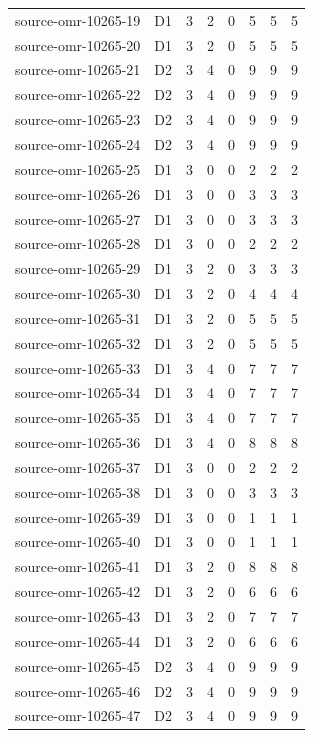 \begin{longtable}{p{}lrrrrrr}
source-omr-10265-19 & D1 & 3 & 2 & 0 & 5 & 5 & 5\\
source-omr-10265-20 & D1 & 3 & 2 & 0 & 5 & 5 & 5\\
source-omr-10265-21 & D2 & 3 & 4 & 0 & 9 & 9 & 9\\
source-omr-10265-22 & D2 & 3 & 4 & 0 & 9 & 9 & 9\\
source-omr-10265-23 & D2 & 3 & 4 & 0 & 9 & 9 & 9\\
source-omr-10265-24 & D2 & 3 & 4 & 0 & 9 & 9 & 9\\
source-omr-10265-25 & D1 & 3 & 0 & 0 & 2 & 2 & 2\\
source-omr-10265-26 & D1 & 3 & 0 & 0 & 3 & 3 & 3\\
source-omr-10265-27 & D1 & 3 & 0 & 0 & 3 & 3 & 3\\
source-omr-10265-28 & D1 & 3 & 0 & 0 & 2 & 2 & 2\\
source-omr-10265-29 & D1 & 3 & 2 & 0 & 3 & 3 & 3\\
source-omr-10265-30 & D1 & 3 & 2 & 0 & 4 & 4 & 4\\
source-omr-10265-31 & D1 & 3 & 2 & 0 & 5 & 5 & 5\\
source-omr-10265-32 & D1 & 3 & 2 & 0 & 5 & 5 & 5\\
source-omr-10265-33 & D1 & 3 & 4 & 0 & 7 & 7 & 7\\
source-omr-10265-34 & D1 & 3 & 4 & 0 & 7 & 7 & 7\\
source-omr-10265-35 & D1 & 3 & 4 & 0 & 7 & 7 & 7\\
source-omr-10265-36 & D1 & 3 & 4 & 0 & 8 & 8 & 8\\
source-omr-10265-37 & D1 & 3 & 0 & 0 & 2 & 2 & 2\\
source-omr-10265-38 & D1 & 3 & 0 & 0 & 3 & 3 & 3\\
source-omr-10265-39 & D1 & 3 & 0 & 0 & 1 & 1 & 1\\
source-omr-10265-40 & D1 & 3 & 0 & 0 & 1 & 1 & 1\\
source-omr-10265-41 & D1 & 3 & 2 & 0 & 8 & 8 & 8\\
source-omr-10265-42 & D1 & 3 & 2 & 0 & 6 & 6 & 6\\
source-omr-10265-43 & D1 & 3 & 2 & 0 & 7 & 7 & 7\\
source-omr-10265-44 & D1 & 3 & 2 & 0 & 6 & 6 & 6\\
source-omr-10265-45 & D2 & 3 & 4 & 0 & 9 & 9 & 9\\
source-omr-10265-46 & D2 & 3 & 4 & 0 & 9 & 9 & 9\\
source-omr-10265-47 & D2 & 3 & 4 & 0 & 9 & 9 & 9\\

\end{longtable}
